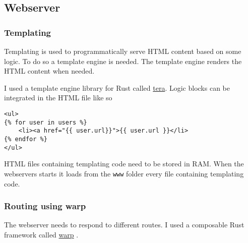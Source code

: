 \documentclass[../documentation.tex]{subfiles}
\begin{document}
\pagebreak

\subsection{Webserver}

\subsubsection{Templating}

Templating is used to programmatically serve HTML content based on some logic.
To do so a template engine is needed. The template engine renders the HTML content
when needed.

I used a template engine library for Rust called
\href{https://github.com/Keats/tera}{tera}.
Logic blocks can be integrated in the HTML file like so
\begin{lstlisting}[style=html]
<ul>
{% for user in users %}
    <li><a href="{{ user.url}}">{{ user.url }}</li>
{% endfor %}
</ul>
\end{lstlisting}

HTML files containing templating code need to be stored in RAM.
When the webservers starts it loads from the \texttt{www} folder
every file containing templating code.

\subsubsection{Routing using warp}

The webserver needs to respond to different routes.
I used a composable Rust framework called
\href{https://github.com/seanmonstar/warp}{warp} \cite{warp}.
\end{document}
